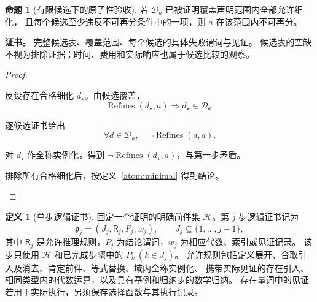 \documentclass[UTF8,12pt,a4paper,openany,fontset=none,zihao=false]{ctexrep}
\theoremstyle{definition}
\newtheorem{definition}{定义}[chapter]
\newtheorem{proposition}{命题}[chapter]
\newenvironment{certificate}{\par\noindent\textbf{证书。}\ignorespaces}{\par}
\newcommand{\1}{\mathbf 1}
\begin{document}
\begin{proposition}[有限候选下的原子性验收]
\label{atom:minimal-check}
若 \(\mathcal D_a\) 已被证明覆盖声明范围内全部允许细化，
且每个候选至少违反不可再分条件中的一项，则 \(a\) 在该范围内不可再分。
\end{proposition}
\begin{certificate}
完整候选表、覆盖范围、每个候选的具体失败谓词与见证。
候选表的空缺不视为排除证据；时间、费用和实际响应也属于候选比较的观察。
\end{certificate}
\begin{proof}
\begin{semanticsteps}
\item 反设存在合格细化 \(d_\star\)。由候选覆盖，
\[
\operatorname{Refines}(d_\star,a)\Longrightarrow d_\star\in\mathcal D_a.
\]
\item 逐候选证书给出
\[
\forall d\in\mathcal D_a,\quad
\neg\operatorname{Refines}(d,a).
\]
\item 对 \(d_\star\) 作全称实例化，得到
\(\neg\operatorname{Refines}(d_\star,a)\)，与第一步矛盾。
\item 排除所有合格细化后，按定义~\ref{atom:minimal} 得到结论。
\end{semanticsteps}
\end{proof}

\begin{definition}[单步逻辑证书]
\label{atom:inference}
固定一个证明的明确前件集 \(\mathcal H\)。第 \(j\) 步逻辑证书记为
\[
\mathfrak p_j=(J_j,\mathsf R_j,P_j,w_j),
\qquad J_j\subseteq\{1,\ldots,j-1\},
\]
其中 \(\mathsf R_j\) 是允许推理规则，\(P_j\) 为结论谓词，\(w_j\) 为相应代数、索引或见证记录。
该步只使用 \(\mathcal H\) 和已完成步骤中的 \(P_k\ (k\in J_j)\)。
允许规则包括定义展开、合取引入及消去、肯定前件、等式替换、域内全称实例化、
携带实际见证的存在引入、相同类型内的代数运算，以及具有基例和归纳步的数学归纳。
存在量词中的见证若用于实际执行，另须保存选择函数与其执行记录。
\end{definition}
\end{document}
